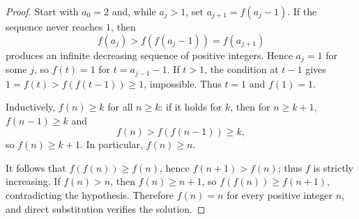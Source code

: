 
\begin{dlsummary}[title={\bfseries Solution 12. IMO 1977 -- Problem 6},breakable]

\begin{proof}
Start with $a_0=2$ and, while $a_j>1$, set $a_{j+1}=f(a_j-1)$. If
the sequence never reaches $1$, then
\[
f(a_j)>f(f(a_j-1))=f(a_{j+1})
\]
produces an infinite decreasing sequence of positive integers. Hence
$a_j=1$ for some $j$, so $f(t)=1$ for $t=a_{j-1}-1$. If $t>1$,
the condition at $t-1$ gives $1=f(t)>f(f(t-1))\geq1$, impossible.
Thus $t=1$ and $f(1)=1$.

Inductively, $f(n)\geq k$ for all $n\geq k$: if it holds for $k$,
then for $n\geq k+1$, $f(n-1)\geq k$ and
\[
f(n)>f(f(n-1))\geq k,
\]
so $f(n)\geq k+1$. In particular, $f(n)\geq n$.

It follows that $f(f(n))\geq f(n)$, hence $f(n+1)>f(n)$; thus $f$
is strictly increasing. If $f(n)>n$, then $f(n)\geq n+1$, so
$f(f(n))\geq f(n+1)$, contradicting the hypothesis. Therefore
$f(n)=n$ for every positive integer $n$, and direct substitution verifies
the solution.
\end{proof}

\end{dlsummary}